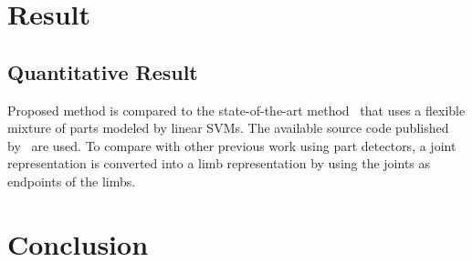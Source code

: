 \documentclass[master,english,final]{postech-ucs}
\begin{document}

\chapter{Result}
\label{sec:result}
\section{Quantitative Result}

Proposed method is compared to the state-of-the-art method~\cite{FMP:2011} that uses a flexible mixture of parts modeled by linear SVMs. The available source code published by~\cite{FMP:2011} are used. To compare with other previous work using part detectors, a joint representation is converted into a limb representation by using the joints as endpoints of the limbs.


\chapter{Conclusion}
\end{document}
